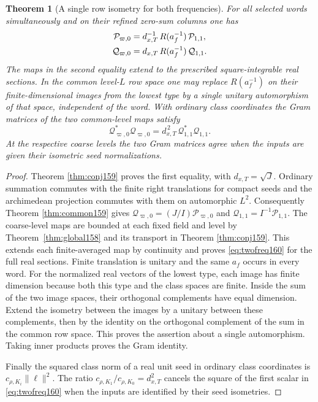 \documentclass[a4paper,11pt]{article}
\newtheorem{theorem}[proposition]{Theorem}
\theoremstyle{definition}
\theoremstyle{remark}
\numberwithin{equation}{section}
\begin{document}
\begin{theorem}[A single row isometry for both frequencies]
\label{thm:twofreq160}
For all selected words simultaneously and on their refined
zero-sum columns one has
\begin{align}
  \mathcal P_{\varpi,0}
    &=d_{x,T}^{-1}\,R(a_f^{-1})\,\mathcal P_{1,1},\notag\\
  \mathcal Q_{\varpi,0}
    &= d_{x,T}\,R(a_f^{-1})\,\mathcal Q_{1,1}.
     \label{eq:twofreq160}
\end{align}
The maps in the second equality extend to the prescribed
square-integrable real sections. In the common level-\(L\)
row space one may replace \(R(a_f^{-1})\) on their
finite-dimensional images from the lowest type by a single
unitary automorphism of that space, independent of the word.
With ordinary class coordinates the Gram matrices of the
two common-level maps satisfy
\[
      \mathcal Q_{\varpi,0}^{*}\mathcal Q_{\varpi,0}
           =d_{x,T}^{\,2}\,\mathcal Q_{1,1}^{*}\mathcal Q_{1,1}.
\]
At the respective coarse levels the two Gram matrices agree
when the inputs are given their isometric seed
normalizations.
\end{theorem}
\begin{proof}
Theorem \ref{thm:conj159} proves the first equality, with
\(d_{x,T}=\sqrt J\). Ordinary summation commutes with the
finite right translations for compact seeds and the archimedean
projection commutes with them on automorphic \(L^2\).
Consequently Theorem \ref{thm:common159} gives
\(\mathcal Q_{\varpi,0}=(J/I)\mathcal P_{\varpi,0}\) and
\(\mathcal Q_{1,1}=I^{-1}\mathcal P_{1,1}\).
The coarse-level maps are bounded at each fixed field and
level by Theorem~\ref{thm:global158} and its transport
in Theorem \ref{thm:conj159}. This extends each finite-averaged
map by continuity and proves \eqref{eq:twofreq160} for the
full real sections. Finite translation is unitary and the
same \(a_f\) occurs in every word. For the normalized real
vectors of the lowest type, each image has finite dimension
because both this type and the class spaces are finite.
Inside the sum of the two image spaces, their orthogonal
complements have equal dimension. Extend the isometry between
the images by a unitary between these complements, then by
the identity on the orthogonal complement of the sum in the
common row space. This proves the assertion about a single
automorphism. Taking inner products proves the Gram identity.

Finally the squared class norm of a real unit seed in ordinary
class coordinates is \(c_{\rho,K_i}\|\ell\|^2\). The ratio
\(c_{\rho,K_1}/c_{\rho,K_0}=d_{x,T}^2\) cancels the square
of the first scalar in \eqref{eq:twofreq160} when the inputs
are identified by their seed isometries.
\end{proof}
\end{document}
